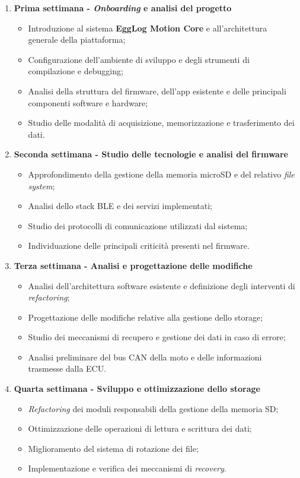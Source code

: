 \begin{enumerate}

    \item \textbf{Prima settimana - \textit{Onboarding} e analisi del progetto}
    \begin{itemize}
        \item Introduzione al sistema \textbf{EggLog Motion Core} e all'architettura generale della piattaforma;
        \item Configurazione dell'ambiente di sviluppo e degli strumenti di compilazione e debugging;
        \item Analisi della struttura del firmware, dell'app esistente e delle principali componenti software e hardware;
        \item Studio delle modalità di acquisizione, memorizzazione e trasferimento dei dati.
    \end{itemize}

    \item \textbf{Seconda settimana - Studio delle tecnologie e analisi del firmware}
    \begin{itemize}
        \item Approfondimento della gestione della memoria microSD e del relativo \textit{file system};
        \item Analisi dello stack BLE e dei servizi implementati;
        \item Studio dei protocolli di comunicazione utilizzati dal sistema;
        \item Individuazione delle principali criticità presenti nel firmware.
    \end{itemize}

    \item \textbf{Terza settimana - Analisi e progettazione delle modifiche}
    \begin{itemize}
        \item Analisi dell'architettura software esistente e definizione degli interventi di \textit{refactoring};
        \item Progettazione delle modifiche relative alla gestione dello storage;
        \item Studio dei meccanismi di recupero e gestione dei dati in caso di errore;
        \item Analisi preliminare del bus CAN della moto e delle informazioni trasmesse dalla ECU.
    \end{itemize}

    \item \textbf{Quarta settimana - Sviluppo e ottimizzazione dello storage}
    \begin{itemize}
        \item \textit{Refactoring} dei moduli responsabili della gestione della memoria SD;
        \item Ottimizzazione delle operazioni di lettura e scrittura dei dati;
        \item Miglioramento del sistema di rotazione dei file;
        \item Implementazione e verifica dei meccanismi di \textit{recovery}.
    \end{itemize}


\end{enumerate}

